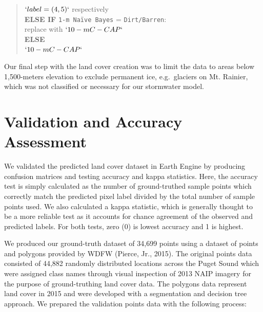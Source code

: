 \documentclass[
]{report}
\begin{document}
\begin{quote}
\hspace*{0.333em}\hspace*{0.333em}\(`label = (4,5)`\) respectively\\
\hspace*{0.333em}\textbf{ELSE IF} \texttt{1-m\ Naïve\ Bayes} = \texttt{Dirt/Barren}:\\
\hspace*{0.333em}\hspace*{0.333em}\hspace*{0.333em}replace with \(`10-m C-CAP`\)\\
\hspace*{0.333em}\textbf{ELSE}\\
\hspace*{0.333em}\hspace*{0.333em}\(`10-m C-CAP`\)
\end{quote}

Our final step with the land cover creation was to limit the data to areas below 1,500-meters elevation to exclude permanent ice, e.g.~glaciers on Mt. Rainier, which was not classified or necessary for our stormwater model.

\hypertarget{validation-and-accuracy-assessment}{%
\section{Validation and Accuracy Assessment}\label{validation-and-accuracy-assessment}}

We validated the predicted land cover dataset in Earth Engine by producing confusion matrices and testing accuracy and kappa statistics. Here, the accuracy test is simply calculated as the number of ground-truthed sample points which correctly match the predicted pixel label divided by the total number of sample points used. We also calculated a kappa statistic, which is generally thought to be a more reliable test as it accounts for chance agreement of the observed and predicted labels. For both tests, zero (0) is lowest accuracy and 1 is highest.

We produced our ground-truth dataset of 34,699 points using a dataset of points and polygons provided by WDFW (Pierce, Jr., 2015). The original points data consisted of 44,882 randomly distributed locations across the Puget Sound which were assigned class names through visual inspection of 2013 NAIP imagery for the purpose of ground-truthing land cover data. The polygons data represent land cover in 2015 and were developed with a segmentation and decision tree approach. We prepared the validation points data with the following process:
\end{document}

